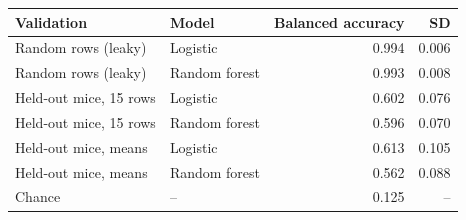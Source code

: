 \begin{tabular}{llrr}
\toprule
Validation & Model & Balanced accuracy & SD \\
\midrule
Random rows (leaky) & Logistic & 0.994 & 0.006 \\
Random rows (leaky) & Random forest & 0.993 & 0.008 \\
Held-out mice, 15 rows & Logistic & 0.602 & 0.076 \\
Held-out mice, 15 rows & Random forest & 0.596 & 0.070 \\
Held-out mice, means & Logistic & 0.613 & 0.105 \\
Held-out mice, means & Random forest & 0.562 & 0.088 \\
Chance & -- & 0.125 & -- \\
\bottomrule
\end{tabular}
